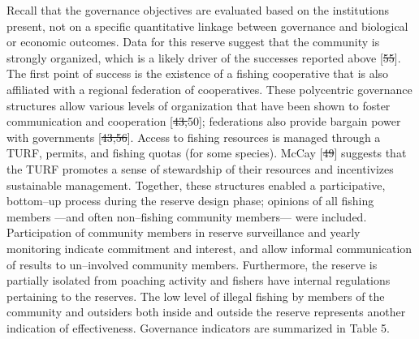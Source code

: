 \documentclass[12pt,]{article}
\providecommand{\DIFaddtex}[1]{{\protect\color{blue}\uwave{#1}}} %
\providecommand{\DIFdeltex}[1]{{\protect\color{red}\sout{#1}}}                      %
\providecommand{\DIFaddbegin}{} %
\providecommand{\DIFaddend}{} %
\providecommand{\DIFdelbegin}{} %
\providecommand{\DIFdelend}{} %
\providecommand{\DIFadd}[1]{\texorpdfstring{\DIFaddtex{#1}}{#1}} %
\providecommand{\DIFdel}[1]{\texorpdfstring{\DIFdeltex{#1}}{}} %
\newcommand{\DIFscaledelfig}{0.5}
\newlength{\DIFdelgraphicswidth} %
\newlength{\DIFdelgraphicsheight} %
\newcommand{\DIFaddincludegraphics}[2][]{{\color{blue}\fbox{\DIFOincludegraphics[#1]{#2}}}} %
\newcommand{\DIFdelincludegraphics}[2][]{%
\sbox{\DIFdelgraphicsbox}{\DIFOincludegraphics[#1]{#2}}%
\settoboxwidth{\DIFdelgraphicswidth}{\DIFdelgraphicsbox} %
\settoboxtotalheight{\DIFdelgraphicsheight}{\DIFdelgraphicsbox} %
\scalebox{\DIFscaledelfig}{%
\parbox[b]{\DIFdelgraphicswidth}{\usebox{\DIFdelgraphicsbox}\\[-\baselineskip] \rule{\DIFdelgraphicswidth}{0em}}\llap{\resizebox{\DIFdelgraphicswidth}{\DIFdelgraphicsheight}{%
\setlength{\unitlength}{\DIFdelgraphicswidth}%
\begin{picture}(1,1)%
\thicklines\linethickness{2pt} %
{\color[rgb]{1,0,0}\put(0,0){\framebox(1,1){}}}%
{\color[rgb]{1,0,0}\put(0,0){\line( 1,1){1}}}%
{\color[rgb]{1,0,0}\put(0,1){\line(1,-1){1}}}%
\end{picture}%
}\hspace*{3pt}}} %
} %
\DeclareRobustCommand{\DIFaddbegin}{\DIFOaddbegin \let\includegraphics\DIFaddincludegraphics} %
\DeclareRobustCommand{\DIFaddend}{\DIFOaddend \let\includegraphics\DIFOincludegraphics} %
\DeclareRobustCommand{\DIFdelbegin}{\DIFOdelbegin \let\includegraphics\DIFdelincludegraphics} %
\DeclareRobustCommand{\DIFdelend}{\DIFOaddend \let\includegraphics\DIFOincludegraphics} %
\begin{document}
Recall that the governance objectives are evaluated based on the
institutions present, not on a specific quantitative linkage between
governance and biological or economic outcomes. Data for this reserve
suggest that the community is strongly organized, which is a likely
driver of the successes reported above {[}\DIFdelbegin \DIFdel{55}\DIFdelend \DIFaddbegin \DIFadd{61}\DIFaddend {]}. The first point of
success is the existence of a fishing cooperative that is also
affiliated with a regional federation of cooperatives. These polycentric
governance structures allow various levels of organization that have
been shown to foster communication and cooperation {[}\DIFdelbegin \DIFdel{43,}\DIFdelend 50\DIFaddbegin \DIFadd{,57}\DIFaddend {]};
federations also provide bargain power with governments {[}\DIFdelbegin \DIFdel{43,56}\DIFdelend \DIFaddbegin \DIFadd{50,62}\DIFaddend {]}.
Access to fishing resources is managed through a TURF, permits, and
fishing quotas (for some species). McCay {[}\DIFdelbegin \DIFdel{49}\DIFdelend \DIFaddbegin \DIFadd{56}\DIFaddend {]} suggests that the TURF
promotes a sense of stewardship of their resources and incentivizes
sustainable management. Together, these structures enabled a
participative, bottom--up process during the reserve design phase;
opinions of all fishing members ---and often non--fishing community
members--- were included. Participation of community members in reserve
surveillance and yearly monitoring indicate commitment and interest, and
allow informal communication of results to un--involved community
members. Furthermore, the reserve is partially isolated from poaching
activity and fishers have internal regulations pertaining to the
reserves. The low level of illegal fishing by members of the community
and outsiders both inside and outside the reserve represents another
indication of effectiveness. Governance indicators are summarized in
Table 5.
\end{document}
